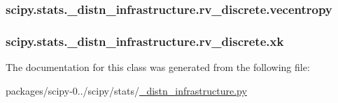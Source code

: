 \subsubsection[{vecentropy}]{\setlength{\rightskip}{0pt plus 5cm}scipy.\+stats.\+\_\+distn\+\_\+infrastructure.\+rv\+\_\+discrete.\+vecentropy}\label{classscipy_1_1stats_1_1__distn__infrastructure_1_1rv__discrete_a82fecb4fc005e5f6d30e7d5239713619}
\hypertarget{classscipy_1_1stats_1_1__distn__infrastructure_1_1rv__discrete_ad9df613da09fbd3d27aff5690b7bb28e}{}
\subsubsection[{xk}]{\setlength{\rightskip}{0pt plus 5cm}scipy.\+stats.\+\_\+distn\+\_\+infrastructure.\+rv\+\_\+discrete.\+xk}\label{classscipy_1_1stats_1_1__distn__infrastructure_1_1rv__discrete_ad9df613da09fbd3d27aff5690b7bb28e}


The documentation for this class was generated from the following file\+:\begin{DoxyCompactItemize}
\item 
packages/scipy-\/0../scipy/stats/\hyperlink{__distn__infrastructure_8py}{\+\_\+distn\+\_\+infrastructure.\+py}\end{DoxyCompactItemize}
